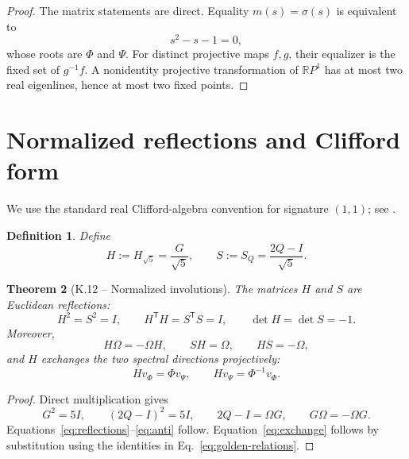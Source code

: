 \documentclass[11pt,letterpaper]{article}
\theoremstyle{kernelstyle}
\newtheorem{theorem}{Theorem}[section]
\newtheorem{definition}[theorem]{Definition}
\newcommand{\R}{\mathbb{R}}
\begin{document}
\begin{proof}
The matrix statements are direct.  Equality $m(s)=\sigma(s)$ is equivalent to
\[
s^2-s-1=0,
\]
whose roots are $\Phi$ and $\Psi$.  For distinct projective maps $f,g$, their equalizer is the fixed set of $g^{-1}f$.  A nonidentity projective transformation of $\R P^1$ has at most two real eigenlines, hence at most two fixed points.
\end{proof}

\section{Normalized reflections and Clifford form}\label{sec:clifford}

We use the standard real Clifford-algebra convention for signature $(1,1)$; see \cite{LawsonMichelsohn}.

\begin{definition}
Define
\begin{equation}\label{eq:hands}
H:=H_{\sqrt5}=\frac{G}{\sqrt5},
\qquad
S:=S_Q=\frac{2Q-I}{\sqrt5}.
\end{equation}
\end{definition}

\begin{theorem}[K.12 -- Normalized involutions]\label{thm:involutions}
The matrices $H$ and $S$ are Euclidean reflections:
\begin{equation}\label{eq:reflections}
H^2=S^2=I,
\qquad
H^{\mathsf T}H=S^{\mathsf T}S=I,
\qquad
\det H=\det S=-1.
\end{equation}
Moreover,
\begin{equation}\label{eq:anti}
H\Omega=-\Omega H,
\qquad
SH=\Omega,
\qquad
HS=-\Omega,
\end{equation}
and $H$ exchanges the two spectral directions projectively:
\begin{equation}\label{eq:exchange}
Hv_\Phi=\Phi v_\Psi,
\qquad
Hv_\Psi=\Phi^{-1}v_\Phi.
\end{equation}
\end{theorem}

\begin{proof}
Direct multiplication gives
\[
G^2=5I,
\qquad
(2Q-I)^2=5I,
\qquad
2Q-I=\Omega G,
\qquad
G\Omega=-\Omega G.
\]
Equations~\eqref{eq:reflections}--\eqref{eq:anti} follow.  Equation~\eqref{eq:exchange} follows by substitution using the identities in Eq.~\eqref{eq:golden-relations}.
\end{proof}
\end{document}
